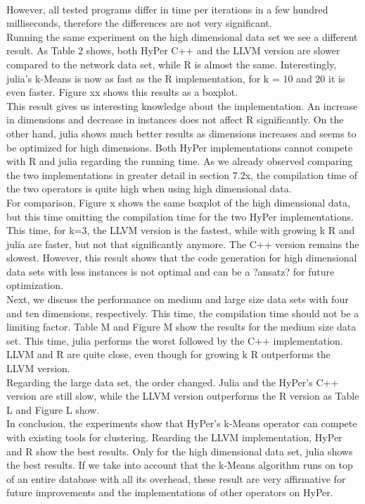 \\
However, all tested programs differ in time per iterations in a few hundred milliseconds, therefore the differences are not very significant.
\\
Running the same experiment on the high dimensional data set we see a different result. As Table 2 shows, both HyPer C++ and the LLVM version are slower compared to the network data set, while R is almost the same. Interestingly, julia’s k-Means is now as fast as the R implementation, for k = 10 and 20 it is even faster. Figure xx shows this results as a boxplot. 
\\
This result gives us interesting knowledge about the implementation. An increase in dimensions and decrease in instances does not affect R significantly. On the other hand, julia shows much better results as dimensions increases and seems to be optimized for high dimensions. Both HyPer implementations cannot compete with R and julia regarding the running time. As we already observed comparing the two implementations in greater detail in section 7.2x, the compilation time of the two operators is quite high when using high dimensional data.
\\
For comparison, Figure x shows the same boxplot of the high dimensional data, but this time omitting the compilation time for the two HyPer implementations. This time, for k=3, the LLVM version is the fastest, while with growing k R and julia are faster, but not that significantly anymore. The C++ version remains the slowest. However, this result shows that the code generation for high dimensional data sets with less instances is not optimal and can be a ?ansatz? for future optimization.
\\
Next, we discuss the performance on medium and large size data sets with four and ten dimensions, respectively. This time, the compilation time should not be a limiting factor. Table M and Figure M show the results for  the medium size data set. This time, julia performs the worst followed by the C++ implementation. LLVM and R are quite close, even though for growing k R outperforms the LLVM version. 
\\
Regarding the large data set, the order changed. Julia and the HyPer’s C++ version are still slow, while the LLVM version outperforms the R version as Table L and Figure L show.
\\
In conclusion, the experiments show that HyPer’s k-Means operator can compete with existing tools for clustering. Rearding the LLVM implementation, HyPer and R show the best results. Only for the high dimensional data set, julia shows the best results. If we take into account that the k-Means algorithm runs on top of an entire database with all its overhead, these result are very affirmative for future improvements and the implementations of other operators on HyPer.


